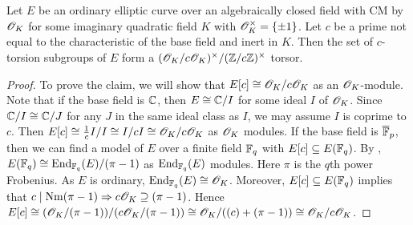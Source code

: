 \documentclass{amsart}
\begin{document}
\begin{lemma}\label{lem:c-torsor}
  Let $E$ be an ordinary elliptic curve over an algebraically closed field with CM by $\mathscr{O}_K$ for some imaginary quadratic field $K$ with $\mathscr{O}_K^\times = \{\pm 1\}$. Let $c$ be a prime not equal to the characteristic of the base field and inert in $K$. Then the set of $c$-torsion subgroups of $E$ form a $(\mathscr{O}_K/c\mathscr{O}_K)^\times/(\mathbb{Z}/c\mathbb{Z})^\times$ torsor.
\end{lemma}
\begin{proof}
  To prove the claim, we will show that $E[c] \cong \mathscr{O}_K/c\mathscr{O}_K$ as an $\mathscr{O}_K$-module. Note that if the base field is $\mathbb{C}$, then $E \cong \mathbb{C}/I$ for some ideal $I$ of $\mathscr{O}_K$. Since $\mathbb{C}/I \cong \mathbb{C}/J$ for any $J$ in the same ideal class as $I$, we may assume $I$ is coprime to $c$. Then $E[c] \cong \frac{1}{c}I/I \cong I/cI \cong \mathscr{O}_K/c\mathscr{O}_K$ as $\mathscr{O}_K$ modules. If the base field is $\overline{\mathbb{F}}_p$, then we can find a model of $E$ over a finite field $\mathbb{F}_q$ with $E[c] \subseteq E(\mathbb{F}_q)$. By \cite[Thm.~1]{complex1996lenstra}, $E(\mathbb{F}_q) \cong \operatorname{End}_{\mathbb{F}_q}(E) / (\pi - 1)$ as $\operatorname{End}_{\mathbb{F}_q}(E)$ modules. Here $\pi$ is the $q$th power Frobenius. As $E$ is ordinary, $\operatorname{End}_{\mathbb{F}_q}(E) \cong \mathscr{O}_K$. Moreover, $E[c] \subseteq E(\mathbb{F}_q)$ implies that $c \mid \operatorname{Nm}(\pi - 1) \Rightarrow c\mathscr{O}_K \supseteq (\pi - 1)$. Hence $E[c] \cong (\mathscr{O}_K/(\pi - 1))/(c\mathscr{O}_K/(\pi - 1)) \cong \mathscr{O}_K/((c) + (\pi - 1)) \cong \mathscr{O}_K/c\mathscr{O}_K$.
\end{proof}
\end{document}
